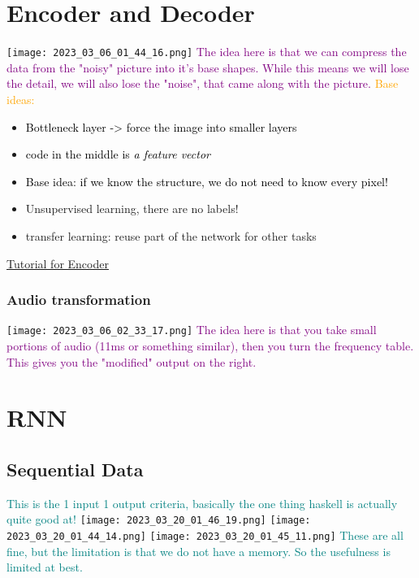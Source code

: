 \documentclass[main.tex,fontsize=8pt,paper=a4,paper=portrait,DIV=calc,]{scrartcl}
\begin{document}
\section{Encoder and Decoder}
\texttt{[image: 2023\_03\_06\_01\_44\_16.png]}\newline
\textcolor{purple}{The idea here is that we can compress the data from the "noisy" picture into it's base shapes. \newline
While this means we will lose the detail, we will also lose the "noise", that came along with the picture.}\newline
\textcolor{orange}{Base ideas:}
\begin{itemize}
\item \textcolor{black}{Bottleneck layer -> force the image into smaller layers}
\item \textcolor{black}{code in the middle is \emph{a feature vector}}
\item \textcolor{black}{Base idea: if we know the structure, we do not need to know every pixel!}
\item Unsupervised learning, there are no labels!
\item transfer learning: reuse part of the network for other tasks
\end{itemize} 
\href{https://www.tensorflow.org/tutorials/generative/autoencoder}{Tutorial for Encoder}

\subsubsection{Audio transformation}
\texttt{[image: 2023\_03\_06\_02\_33\_17.png]}\newline
\textcolor{purple}{The idea here is that you take small portions of audio (11ms or something similar), then you turn the frequency table. This gives you the "modified" output on the right.}

\section{RNN}

\subsection{Sequential Data}
\textcolor{teal}{This is the 1 input 1 output criteria, basically the one thing haskell is actually quite good at!}\newline
\texttt{[image: 2023\_03\_20\_01\_46\_19.png]}\newline
\texttt{[image: 2023\_03\_20\_01\_44\_14.png]}
\texttt{[image: 2023\_03\_20\_01\_45\_11.png]}\newline
\textcolor{teal}{These are all fine, but the limitation is that we do not have a memory. So the usefulness is limited at best.}
\end{document}
